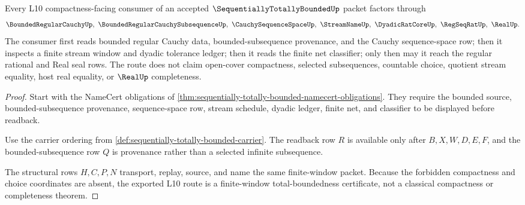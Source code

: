 \begin{theorem}
\label{thm:sequentially-totally-bounded-l10-finite-window-route}
Every L10 compactness-facing consumer of an accepted $\SequentiallyTotallyBoundedUp$ packet factors through
$$
\BoundedRegularCauchyUp,\ \BoundedRegularCauchySubsequenceUp,\ \CauchySequenceSpaceUp,\ \StreamNameUp,\ \DyadicRatCoreUp,\ \RegSeqRatUp,\ \RealUp .
$$
The consumer first reads bounded regular Cauchy data, bounded-subsequence provenance, and the Cauchy sequence-space row; then it inspects a finite stream window and dyadic tolerance ledger; then it reads the finite net classifier; only then may it reach the regular rational and Real seal rows. The route does not claim open-cover compactness, selected subsequences, countable choice, quotient stream equality, host real equality, or $\RealUp$ completeness.
\end{theorem}
\begin{proof}
Start with the NameCert obligations of \autoref{thm:sequentially-totally-bounded-namecert-obligations}. They require the bounded source, bounded-subsequence provenance, sequence-space row, stream schedule, dyadic ledger, finite net, and classifier to be displayed before readback.

Use the carrier ordering from \autoref{def:sequentially-totally-bounded-carrier}. The readback row $R$ is available only after $B,X,W,D,E,F$, and the bounded-subsequence row $Q$ is provenance rather than a selected infinite subsequence.

The structural rows $H,C,P,N$ transport, replay, source, and name the same finite-window packet. Because the forbidden compactness and choice coordinates are absent, the exported L10 route is a finite-window total-boundedness certificate, not a classical compactness or completeness theorem.
\end{proof}


